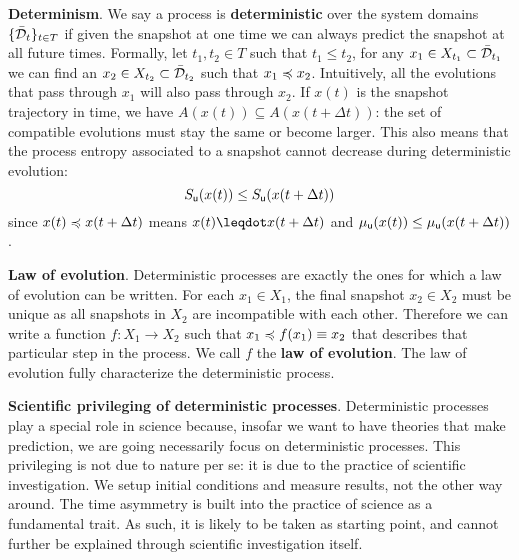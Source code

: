 \documentclass[10pt, onecolumn, longbibliography, nofootinbib]{revtex4-2}
\begin{document}
\textbf{Determinism}. We say a process is \textbf{deterministic} over the system domains $\{\tdomain_t\}_{t \in T}$ if given the snapshot at one time we can always predict the snapshot at all future times. Formally, let $t_1, t_2 \in T$ such that $t_1 \leq t_2$, for any $x_1 \in X_{t_1} \subset \tdomain_{t_1}$ we can find an $x_2 \in X_{t_2} \subset \tdomain_{t_2}$ such that $x_1 \narrower x_2$. Intuitively, all the evolutions that pass through $x_1$ will also pass through $x_2$. If $x(t)$ is the snapshot trajectory in time, we have $A(x(t)) \subseteq A(x(t + \Delta t))$: the set of compatible evolutions must stay the same or become larger. This also means that the process entropy associated to a snapshot cannot decrease during deterministic evolution:
\begin{equation}\label{entropy_determinism}
	S_{\stmt[u]}(x(t)) \leq S_{\stmt[u]}(x(t + \Delta t))
\end{equation}
since $x(t)\narrower x(t+\Delta t)$ means $x(t) \finer x(t+\Delta t)$ and $\mu_{\stmt[u]}(x(t)) \leq \mu_{\stmt[u]}(x(t+\Delta t))$.

\textbf{Law of evolution}. Deterministic processes are exactly the ones for which a law of evolution can be written. For each $x_1 \in X_1$, the final snapshot $x_2 \in X_2$ must be unique as all snapshots in $X_2$ are incompatible with each other. Therefore we can write a function $f : X_1 \to X_2$ such that $x_1 \narrower f(x_1) \equiv x_2$ that describes that particular step in the process. We call $f$ the \textbf{law of evolution}. The law of evolution fully characterize the deterministic process.

\textbf{Scientific privileging of deterministic processes}. Deterministic processes play a special role in science because, insofar we want to have theories that make prediction, we are going necessarily focus on deterministic processes. This privileging is not due to nature per se: it is due to the practice of scientific investigation. We setup initial conditions and measure results, not the other way around. The time asymmetry is built into the practice of science as a fundamental trait. As such, it is likely to be taken as starting point, and cannot further be explained through scientific investigation itself.
\end{document}
